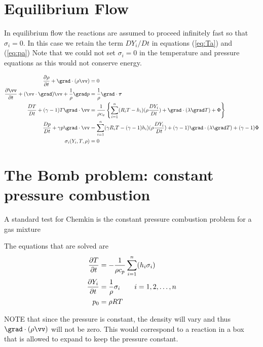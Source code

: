 \documentclass{article}
\begin{document}
\section{Equilibrium Flow}

In equilibrium flow the reactions are assumed to proceed infinitely fast so that $\sigma_i=0$. 
In this case we retain the term $DY_i/Dt$ in equations (\ref{eq:Ta}) and (\ref{eq:pa})
Note that we could not set $\sigma_i=0$ in the temperature and pressure equations as this
would not conserve energy.


\begin{align*}
   {\partial \rho  \over \partial t} + \grad\cdot(\rho \vv)&=0 \\
   {\partial \vv  \over \partial t}  + (\vv\cdot\grad)\vv +{1\over\rho} \grad p &= {1\over\rho}\grad\cdot\tauv \\
  {D T\over Dt} + (\gamma-1) T \grad\cdot\vv & = 
       {1\over \rho c_v}  \left\{ \sumi  (R_i T-h_i) (\rho{D Y_i\over Dt}) + \grad\cdot(\lambda\grad T)
              + \Phi \right\}  \\
    {D p\over Dt} + \gamma p \grad\cdot\vv &= 
        \sumi  ({\gamma R_i} T- (\gamma-1)h_i) (\rho{D Y_i\over Dt}) + (\gamma-1) \grad\cdot(\lambda\grad T)
              + (\gamma-1) \Phi \\
   \sigma_i(Y_i,T,\rho) & = 0 
\end{align*}

\section{The Bomb problem: constant pressure combustion}

A standard test for Chemkin is the constant pressure combustion problem for a gas mixture

The equations that are solved are
\begin{align*}
   {\partial T\over \partial t} &= - {1\over \rho c_p} \sum_{i=1}^n (h_i\sigma_i)   \\
   {\partial Y_i\over \partial t} &= {1\over \rho }  \sigma_i \qquad i=1,2,\ldots,n \\
   p_0 &= \rho R T
\end{align*}

NOTE that since the pressure is constant, the density will vary and thus $\grad\cdot(\rho\vv)$
will not be zero. This would correspond to a reaction in a box that is allowed to expand to
keep the pressure constant.
\end{document}
